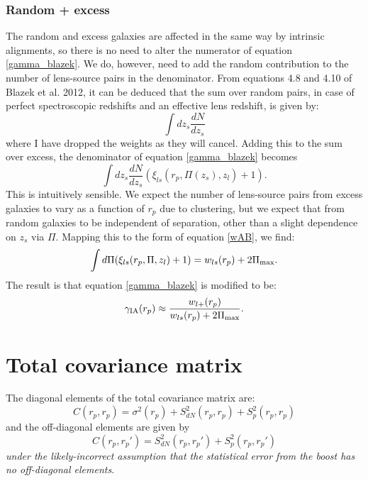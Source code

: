 \documentclass[onecolumn,amsmath,aps,fleqn, superscriptaddress]{revtex4}
\begin{document}
\subsubsection*{Random + excess}
The random and excess galaxies are affected in the same way by intrinsic alignments, so there is no need to alter the numerator of equation \ref{gamma_blazek}.
 We do, however, need to add the random contribution to the number of lens-source pairs in the denominator. From equations 4.8 and 4.10 of Blazek et al. 2012, it can be deduced that the sum over random pairs, in case of perfect spectroscopic redshifts and an effective lens redshift, is given by:
\begin{equation}
\int dz_s \frac{dN}{dz_s} 
\end{equation}
where I have dropped the weights as they will cancel. Adding this to the sum over excess, the denominator of equation \ref{gamma_blazek} becomes
\begin{equation}
\int dz_s \frac{dN}{dz_s} \left(\xi_{ls}(r_p, \Pi(z_s), z_l) + 1\right).
\label{denom_rand}
\end{equation}
This is intuitively sensible. We expect the number of lens-source pairs from excess galaxies to vary as a function of $r_p$ due to clustering, but we expect that from random galaxies to be independent of separation, other than a slight dependence on $z_s$ via $\Pi$. Mapping this to the form of equation \ref{wAB}, we find:
\begin{equation}
\int d\Pi (\xi_{ls}(r_p, \Pi, z_l) + 1) = w_{ls}(r_p) + 2\Pi_{\rm max}.
\label{wl}
\end{equation}
The result is that equation \ref{gamma_blazek} is modified to be:
\begin{equation}
\gamma_{\rm IA}(r_p) \approx \frac{w_{l+}(r_p)}{w_{ls}(r_p) + 2 \Pi_{\rm max}}.
\label{gamma_blazek_randoms}
\end{equation} 


\section*{Total covariance matrix}

The diagonal elements of the total covariance matrix are:
\begin{equation}
C(r_p,r_p) = \sigma^2(r_p) + S_{dN}^2(r_p, r_p) + S_{p}^2(r_p, r_p)
\label{diag}
\end{equation}
and the off-diagonal elements are given by
\begin{equation}
C(r_p, r_p') = S_{dN}^2(r_p,r_p')+S_{p}^2(r_p,r_p')
\label{off_diag}
\end{equation}
{\it under the likely-incorrect assumption that the statistical error from the boost has no off-diagonal elements}.
\end{document}

